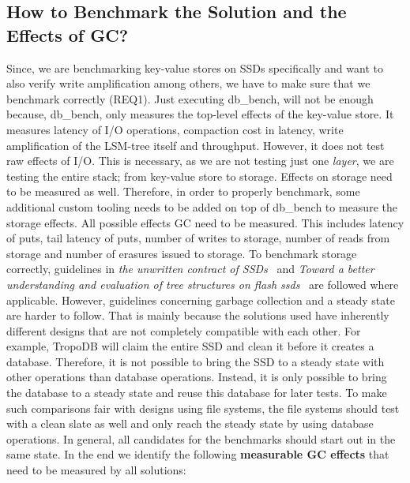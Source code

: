 \subsection{How to Benchmark the Solution and the Effects of GC?}
\label{sec:methodbenchgc}
Since, we are benchmarking key-value stores on SSDs specifically and want to also verify write amplification among others, we have to make sure that we benchmark correctly (REQ1). Just executing db\_bench, will not be enough because, db\_bench, only measures the top-level effects of the key-value store. It measures latency of I/O operations, compaction cost in latency, write amplification of the LSM-tree itself and throughput. However, it does not test raw effects of I/O. This is necessary, as we are not testing just one \textit{layer}, we are testing the entire stack; from key-value store to storage. Effects on storage need to be measured as well. Therefore, in order to properly benchmark, some additional custom tooling needs to be added on top of db\_bench to measure the storage effects. All possible effects GC need to be measured. This includes latency of puts, tail latency of puts, number of writes to storage, number of reads from storage and number of erasures issued to storage. To benchmark storage correctly, guidelines in \textit{the unwritten contract of SSDs}~\cite{he2017unwritten} and \textit{Toward a better understanding and evaluation of tree structures on flash ssds}~\cite{didona2020toward} are followed where applicable. However, guidelines concerning garbage collection and a steady state are harder to follow. That is mainly because the solutions used have inherently different designs that are not completely compatible with each other. For example, TropoDB will claim the entire SSD and clean it before it creates a database. Therefore, it is not possible to bring the SSD to a steady state with other operations than database operations. Instead, it is only possible to bring the database to a steady state and reuse this database for later tests. To make such comparisons fair with designs using file systems, the file systems should test with a clean slate as well and only reach the steady state by using database operations. In general, all candidates for the benchmarks should start out in the same state.  In the end we identify the following \textbf{measurable GC effects} that need to be measured by all solutions:
